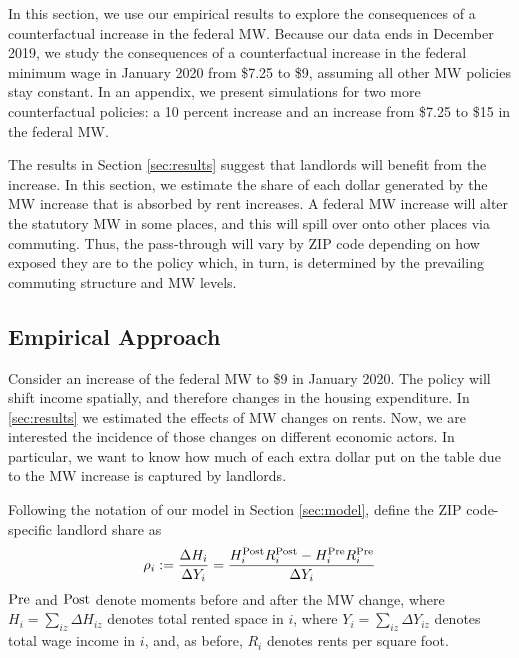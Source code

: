 
In this section, we use our empirical results to explore the consequences of 
a counterfactual increase in the federal MW.
Because our data ends in December 2019, we study the consequences of a 
counterfactual increase in the federal minimum wage in January 2020 from 
\$7.25 to \$9, assuming all other MW policies stay constant. 
In an appendix, we present simulations for two more counterfactual policies: 
a 10 percent increase and an increase from \$7.25 to \$15 in the federal MW.

The results in Section \ref{sec:results} suggest that landlords will benefit
from the increase. 
In this section, we estimate the share of each dollar generated by the MW 
increase that is absorbed by rent increases.
A federal MW increase will alter the statutory MW in some places, and this will
spill over onto other places via commuting.
Thus, the pass-through will vary by ZIP code depending on how exposed they
are to the policy which, in turn, is determined by the prevailing commuting
structure and MW levels.


\subsection{Empirical Approach}\label{sec:emp_cf}

Consider an increase of the federal MW to \$9 in January 2020.
The policy will shift income spatially, and therefore changes in 
the housing expenditure.
In \ref{sec:results} we estimated the effects of MW changes on rents.
Now, we are interested the incidence of those changes on different economic
actors.
In particular, we want to know how much of each extra dollar put on the table 
due to the MW increase is captured by landlords.

Following the notation of our model in Section \ref{sec:model}, define the 
ZIP code-specific landlord share as
\begin{equation*}\label{eq:share_landlords}
    \rho_i := \frac{\Delta H_i}{\Delta Y_i} 
            = \frac{H^{\text{Post}}_i R^{\text{Post}}_i - H^{\text{Pre}}_i R^{\text{Pre}}_i}{\Delta Y_i}
\end{equation*}
$\text{Pre}$ and $\text{Post}$ denote moments before and after the MW change,
where $H_i = \sum_{iz}\Delta H_{iz}$ denotes total rented space in $i$, 
where $Y_i = \sum_{iz}\Delta Y_{iz}$ denotes total wage income in $i$, 
and, as before,
$R_i$ denotes rents per square foot.

